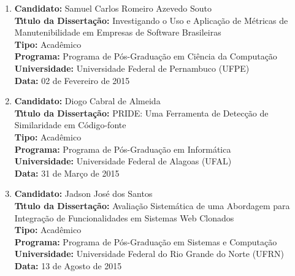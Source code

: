 \documentclass[a4paper,oneside,10pt]{article}
\begin{document}
\begin{enumerate}
\renewcommand{\labelenumi}{{\large\bfseries\arabic{enumi}.}}
\vspace{0.3cm}


\item       \textbf{Candidato:} Samuel Carlos Romeiro Azevedo Souto \mbox{} \\
            \textbf{T\'{\i}tulo da Disserta\c{c}\~{a}o:} Investigando o Uso e Aplicação de Métricas de Manutenibilidade em Empresas de Software Brasileiras\\
            \textbf{Tipo:} Acadêmico\\
            \textbf{Programa:} Programa de Pós-Graduação em Ciência da Computação\\
            \textbf{Universidade:} Universidade Federal de Pernambuco (UFPE)\\
            \textbf{Data:} 02 de Fevereiro de 2015


\item       \textbf{Candidato:} Diogo Cabral de Almeida \mbox{} \\
            \textbf{T\'{\i}tulo da Disserta\c{c}\~{a}o:} PRIDE: Uma Ferramenta de Detecção de Similaridade em Código-fonte\\
            \textbf{Tipo:} Acadêmico\\
            \textbf{Programa:} Programa de Pós-Graduação em Informática\\
            \textbf{Universidade:} Universidade Federal de Alagoas (UFAL)\\
            \textbf{Data:} 31 de Março de 2015
            
            
\item       \textbf{Candidato:} Jadson José dos Santos \mbox{} \\
            \textbf{T\'{\i}tulo da Disserta\c{c}\~{a}o:} Avaliação Sistemática de uma Abordagem para Integração de Funcionalidades em Sistemas Web Clonados\\
            \textbf{Tipo:} Acadêmico\\
            \textbf{Programa:} Programa de Pós-Graduação em Sistemas e Computação\\
            \textbf{Universidade:} Universidade Federal do Rio Grande do Norte (UFRN)\\
            \textbf{Data:} 13 de Agosto de 2015


\end{enumerate}
\end{document}
